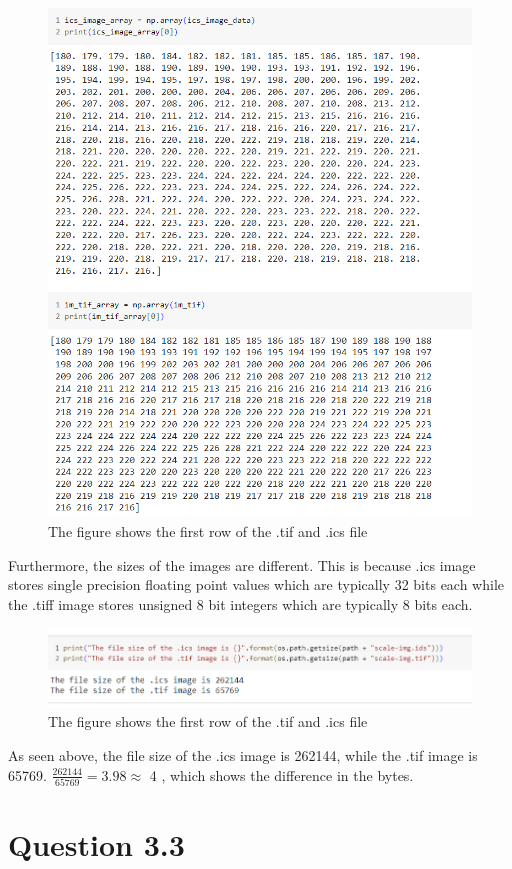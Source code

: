 \documentclass{article}
\begin{document}
\begin{figure}[h!]
\centering
\includegraphics[width=0.8\linewidth]{Report/Images/ics_tif_datatype.png}
\caption{\label{fig:ics_tif_datatype_difference}The figure shows the first row of the .tif and .ics file}
\end{figure}

Furthermore, the sizes of the images are different. This is because .ics image stores single precision floating point values which are typically 32  bits each while the .tiff image stores unsigned 8 bit integers which are typically 8 bits each. 
\begin{figure}[h!]
\centering
\includegraphics[width=0.8\linewidth]{Report/Images/filesize_difference.png}
\caption{\label{fig:ics_tif_filesize_difference}The figure shows the first row of the .tif and .ics file}
\end{figure}
As seen above, the file size of the .ics image is 262144, while the .tif image is 65769. 
$\frac{262144}{65769} = 3.98 \approx$ 4 , which shows the difference in the bytes. 
\clearpage
\section*{Question 3.3}
\end{document}
